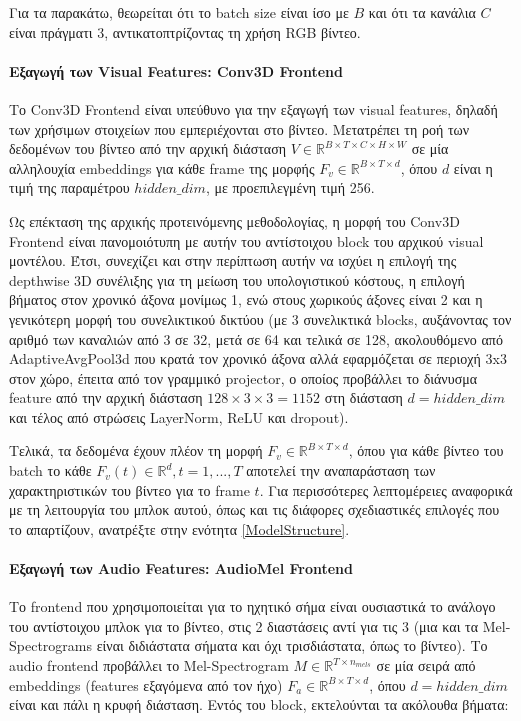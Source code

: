 Για τα παρακάτω, θεωρείται ότι το batch size είναι ίσο με $B$ και ότι τα κανάλια $C$ είναι πράγματι 3, αντικατοπτρίζοντας τη χρήση RGB βίντεο.

\paragraph{Εξαγωγή των Visual Features: Conv3D Frontend}
Το Conv3D Frontend είναι υπεύθυνο για την εξαγωγή των visual features, δηλαδή των χρήσιμων στοιχείων που εμπεριέχονται στο βίντεο. Μετατρέπει τη ροή των δεδομένων του βίντεο από την αρχική διάσταση $V \in \mathbb{R}^{B \times T \times C \times H \times W}$ σε μία αλληλουχία embeddings για κάθε frame της μορφής $F_v \in \mathbb{R}^{B \times T \times d}$, όπου $d$ είναι η τιμή της παραμέτρου $hidden\_dim$, με προεπιλεγμένη τιμή 256.

Ως επέκταση της αρχικής προτεινόμενης μεθοδολογίας, η μορφή του Conv3D Frontend είναι πανομοιότυπη με αυτήν του αντίστοιχου block του αρχικού visual μοντέλου. Έτσι, συνεχίζει και στην περίπτωση αυτήν να ισχύει η επιλογή της depthwise 3D συνέλιξης για τη μείωση του υπολογιστικού κόστους, η επιλογή βήματος στον χρονικό άξονα μονίμως 1, ενώ στους χωρικούς άξονες είναι 2 και η γενικότερη μορφή του συνελικτικού δικτύου (με 3 συνελικτικά blocks, αυξάνοντας τον αριθμό των καναλιών από 3 σε 32, μετά σε 64 και τελικά σε 128, ακολουθόμενο από AdaptiveAvgPool3d που κρατά τον χρονικό άξονα αλλά εφαρμόζεται σε περιοχή 3x3 στον χώρο, έπειτα από τον γραμμικό projector, ο οποίος προβάλλει το διάνυσμα feature από την αρχική διάσταση $128 \times 3 \times 3 = 1152$ στη διάσταση $d = hidden\_dim$ και τέλος από στρώσεις LayerNorm, ReLU και dropout). 

Τελικά, τα δεδομένα έχουν πλέον τη μορφή $F_v \in \mathbb{R}^{B \times T \times d}$, όπου για κάθε βίντεο του batch το κάθε $F_v(t) \in \mathbb{R}^d, t=1,...,T$ αποτελεί την αναπαράσταση των χαρακτηριστικών του βίντεο για το frame $t$. Για περισσότερες λεπτομέρειες αναφορικά με τη λειτουργία του μπλοκ αυτού, όπως και τις διάφορες σχεδιαστικές επιλογές που το απαρτίζουν, ανατρέξτε στην ενότητα \ref{ModelStructure}.

\paragraph{Εξαγωγή των Audio Features: AudioMel Frontend}

Το frontend που χρησιμοποιείται για το ηχητικό σήμα είναι ουσιαστικά το ανάλογο του αντίστοιχου μπλοκ για το βίντεο, στις 2 διαστάσεις αντί για τις 3 (μια και τα Mel-Spectrograms είναι διδιάστατα σήματα και όχι τρισδιάστατα, όπως το βίντεο). Το audio frontend προβάλλει το Mel-Spectrogram $M \in \mathbb{R}^{T \times n_{mels}}$ σε μία σειρά από embeddings (features εξαγόμενα από τον ήχο) $F_a \in \mathbb{R}^{B \times T \times d}$, όπου $d = hidden\_dim$ είναι και πάλι η κρυφή διάσταση. Εντός του block, εκτελούνται τα ακόλουθα βήματα:


